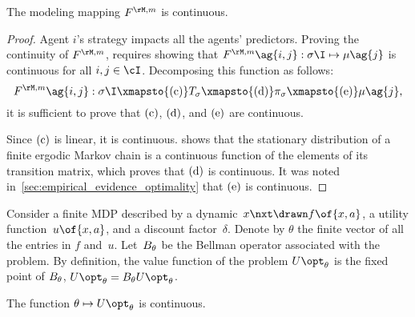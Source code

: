 \begin{proposition}
\label{res:modeling_continuity}
The modeling mapping \(\FM\) is continuous.
\end{proposition}

\begin{proof}
Agent \(i\)'s strategy impacts all the agents' predictors.
Proving the continuity of \(\FM\), requires showing that \(\FM\ag{i, j}: \sigma\I \mapsto \mu\ag{j}\) is continuous for all \(i, j \in \cI\).
Decomposing this function as follows:
\[\FM\ag{i, j}: \sigma\I \xmapsto{\subfunc{c}} T\strat{\sigma} \xmapsto{\subfunc{d}} \pi\strat{\sigma} \xmapsto{\subfunc{e}} \mu\ag{j},
\]
it is sufficient to prove that \(\mathrm{(c)}\), \(\mathrm{(d)}\), and \(\mathrm{(e)}\) are continuous.

Since \(\mathrm{(c)}\) is linear, it is continuous.
\cite[Theorem~4.1]{meyer:1980} shows that the stationary distribution of a finite ergodic Markov chain is a continuous function of the elements of its transition matrix, which proves that \(\mathrm{(d)}\) is continuous.
It was noted in~\cref{sec:empirical_evidence_optimality} that \(\mathrm{(e)}\) is continuous.
\end{proof}

\begin{lemma}
\label{res:markov_continuity}
Consider a finite MDP described by a dynamic~\(x\nxt \drawn f \of{x, a}\), a utility function~\(u \of{x, a}\), and a discount factor~\(\delta\).
Denote by \(\theta\) the finite vector of all the entries in \(f\) and~\(u\).
Let~\(B_{\theta}\) be the Bellman operator associated with the problem.
By definition, the value function of the problem \(\Utheta\) is the fixed point of \(B_{\theta}\), \(\Utheta = \Btheta \Utheta\).

The function \(\theta \mapsto \Utheta\) is continuous.
\end{lemma}

